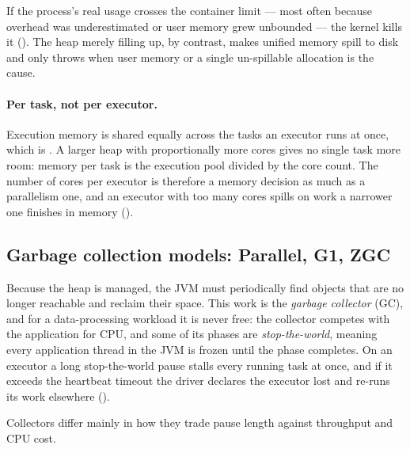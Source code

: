If the process's real usage crosses the container limit --- most often because
overhead was underestimated or user memory grew unbounded --- the kernel kills it
(). The heap merely filling up, by contrast, makes unified
memory spill to disk and only throws when user memory or a single un-spillable
allocation is the cause.

\paragraph{Per task, not per executor.} Execution memory is shared equally across
the tasks an executor runs at once, which is . A
larger heap with proportionally more cores gives no single task more room: memory
per task is the execution pool divided by the core count. The number of cores per
executor is therefore a memory decision as much as a parallelism one, and an
executor with too many cores spills on work a narrower one finishes in memory
().

\subsection{Garbage collection models: Parallel, G1, ZGC}
\label{sec:prereq-gc}

Because the heap is managed, the JVM must periodically find objects that are no
longer reachable and reclaim their space. This work is the \emph{garbage
collector} (GC), and for a data-processing workload it is never free: the
collector competes with the application for CPU, and some of its phases are
\emph{stop-the-world}, meaning every application thread in the JVM is frozen until
the phase completes. On an executor a long stop-the-world pause stalls every
running task at once, and if it exceeds the heartbeat timeout the driver declares
the executor lost and re-runs its work elsewhere ().

Collectors differ mainly in how they trade pause length against throughput and
CPU cost.

